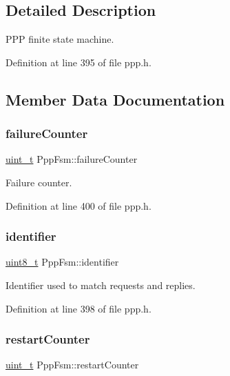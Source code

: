 \subsection{Detailed Description}
P\+PP finite state machine. 

Definition at line 395 of file ppp.\+h.



\subsection{Member Data Documentation}
\mbox{\label{structPppFsm_af1f05d99c0681de3a2c025b676f62bc1}} 
\subsubsection{\texorpdfstring{failure\+Counter}{failureCounter}}
{\footnotesize\ttfamily \hyperlink{compiler__port_8h_a12a1e9b3ce141648783a82445d02b58d}{uint\+\_\+t} Ppp\+Fsm\+::failure\+Counter}



Failure counter. 



Definition at line 400 of file ppp.\+h.

\mbox{\label{structPppFsm_a9920460a6f4ed8ccd264f87ce18bca01}} 
\subsubsection{\texorpdfstring{identifier}{identifier}}
{\footnotesize\ttfamily \hyperlink{stdint_8h_aba7bc1797add20fe3efdf37ced1182c5}{uint8\+\_\+t} Ppp\+Fsm\+::identifier}



Identifier used to match requests and replies. 



Definition at line 398 of file ppp.\+h.

\mbox{\label{structPppFsm_a20a9aac97e60dc38126906103e421c26}} 
\subsubsection{\texorpdfstring{restart\+Counter}{restartCounter}}
{\footnotesize\ttfamily \hyperlink{compiler__port_8h_a12a1e9b3ce141648783a82445d02b58d}{uint\+\_\+t} Ppp\+Fsm\+::restart\+Counter}



